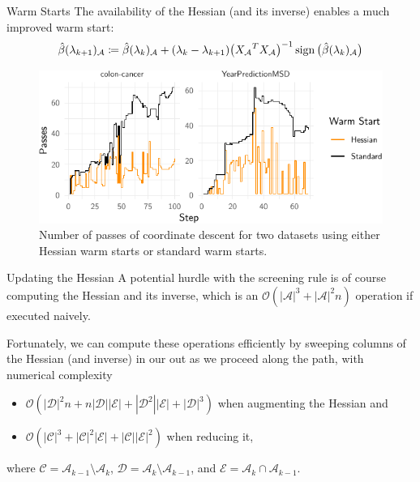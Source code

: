 \documentclass[10pt,ignorenonframetext]{beamer}
\begin{document}
\begin{frame}{Warm Starts}
  The availability of the Hessian (and its inverse) enables a much improved
  warm
  start:
  \[
    \hat\beta(\lambda_{k+1})_\mathcal{A} \coloneqq
    \hat\beta(\lambda_k)_\mathcal{A} +
    (\lambda_k - \lambda_{k+1}) \big({X_\mathcal{A}}^T{X_\mathcal{A}}\big)^{-1}
    \operatorname{sign}\big(\hat\beta(\lambda_k)_\mathcal{A}\big)
  \]
  \pause
  \begin{figure}
    \centering
    \includegraphics{figures/hessian-warm-starts}
    \caption{Number of passes of coordinate descent for two datasets
      using either Hessian warm
      starts or standard warm starts.}
  \end{figure}

\end{frame}

\begin{frame}{Updating the Hessian}
  A potential hurdle with the screening rule is of course computing the Hessian
  and its inverse, which is an \(\mathcal{O}(|\mathcal{A}|^3 +
  |\mathcal{A}|^2n)\) operation if executed naively.

  \medskip

  Fortunately, we can compute these operations efficiently by sweeping columns
  of the Hessian (and inverse) in our out as we proceed along the path, with
  numerical complexity
  \begin{itemize}
    \item \(\mathcal{O}(|\mathcal{D}|^2n + n|\mathcal{D}||\mathcal{E}| +
          |\mathcal{D}^2||\mathcal{E}| + |\mathcal{D}|^3)\) when
          augmenting the Hessian and
    \item \(\mathcal{O}(|\mathcal{C}|^3 + |\mathcal{C}|^2|\mathcal{E}| +
          |\mathcal{C}||\mathcal{E}|^2)\) when reducing it,
  \end{itemize}
  where \(\mathcal{C} = \mathcal{A}_{k-1} \setminus \mathcal{A}_k\),
  \(\mathcal{D} = \mathcal{A}_k \setminus \mathcal{A}_{k-1}\), and
  \(\mathcal{E} = \mathcal{A}_k \cap \mathcal{A}_{k-1}\).
\end{frame}
\end{document}
